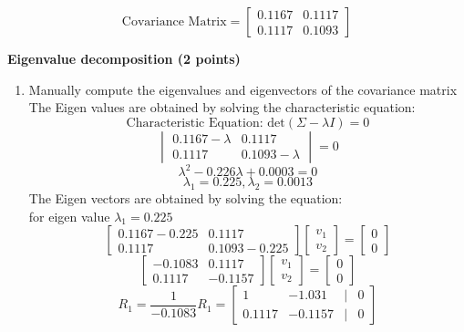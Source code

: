 \documentclass[a3paper,12pt]{extarticle} %
\begin{document}
\begin{enumerate}
\begin{enumerate}
\[    \]
    \[
    \text{Covariance Matrix} = \begin{bmatrix}0.1167  & 0.1117\\0.1117 & 0.1093\end{bmatrix}
    \]
    \end{enumerate}
    \subitem \textbf{Eigenvalue decomposition (2 points)}
    \begin{enumerate}
        \item Manually compute the eigenvalues and eigenvectors of the covariance matrix
        \\ The Eigen values are obtained by solving the characteristic equation:
        \[
        \text{Characteristic Equation: } \text{det}(\Sigma - \lambda I) = 0
        \]
        \[
        \begin{vmatrix}0.1167 - \lambda & 0.1117\\0.1117 & 0.1093 - \lambda\end{vmatrix} = 0
        \]
        \[
        \lambda^2 - 0.226\lambda + 0.0003 = 0
        \]
        \[
        \lambda_1 = 0.225, \lambda_2 = 0.0013
        \]
        The Eigen vectors are obtained by solving the equation:
        \\ for eigen value \(\lambda_1 = 0.225\)
        \[
            \begin{bmatrix}0.1167 - 0.225 & 0.1117\\0.1117 & 0.1093 - 0.225\end{bmatrix} \begin{bmatrix}v_1\\v_2\end{bmatrix} = \begin{bmatrix}0\\0\end{bmatrix}
        \]
        \[
            \begin{bmatrix}-0.1083 & 0.1117\\0.1117 & -0.1157\end{bmatrix} \begin{bmatrix}v_1\\v_2\end{bmatrix} = \begin{bmatrix}0\\0\end{bmatrix}
        \]
        \[
            R_1 = \frac{1}{-0.1083}R_1 = \begin{bmatrix}1 & -1.031 & | & 0\\0.1117 & -0.1157 & | & 0\end{bmatrix}
\]
\end{enumerate}
\end{enumerate}
\end{document}
